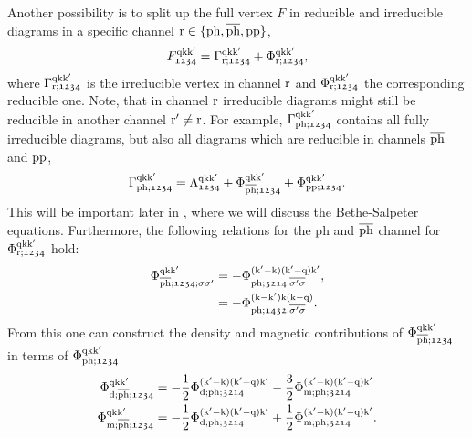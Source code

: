 \documentclass[../../main.tex]{subfiles}
\begin{document}
Another possibility is to split up the full vertex $F$ in reducible and irreducible diagrams in a specific channel $\text{r}\in\{\text{ph},\overline{\text{ph}},\text{pp}\}$,
\begin{align}\label{eq:full_vertex_gamma_phi}
	F_{\mathfrak{1234}}^{\text{q}\text{k}\text{k}'}=\Gamma_{\text{r};\mathfrak{1234}}^{\text{q}\text{k}\text{k}'}+\Phi_{\text{r};\mathfrak{1234}}^{\text{q}\text{k}\text{k}'},
\end{align}
where $\Gamma_{\text{r};\mathfrak{1234}}^{\text{q}\text{k}\text{k}'}$ is the irreducible vertex in channel $\text{r}$ and $\Phi_{\text{r};\mathfrak{1234}}^{\text{q}\text{k}\text{k}'}$ the corresponding reducible one. Note, that in channel $\text{r}$ irreducible diagrams might still be reducible in another channel $\text{r}'\neq \text{r}$. For example, $\Gamma_{\text{ph};\mathfrak{1234}}^{\text{q}\text{k}\text{k}'}$ contains all fully irreducible diagrams, but also all diagrams which are reducible in channels $\overline{\text{ph}}$ and $\text{pp}$,
\begin{align}
	\Gamma_{\text{ph};\mathfrak{1234}}^{\text{q}\text{k}\text{k}'}=\Lambda_{\mathfrak{1234}}^{\text{q}\text{k}\text{k}'}+\Phi_{\overline{\text{ph}};\mathfrak{1234}}^{\text{q}\text{k}\text{k}'}+\Phi_{\text{pp};\mathfrak{1234}}^{\text{q}\text{k}\text{k}'}.
\end{align}
This will be important later in , where we will discuss the Bethe-Salpeter equations. Furthermore, the following relations for the ph and $\overline{\text{ph}}$ channel for $\Phi_{\text{r};\mathfrak{1234}}^{\text{q}\text{k}\text{k}'}$ hold:
\begin{subequations}\label{eq:phi_conversion_ph_bar_to_ph}
\begin{align}
	\Phi_{\overline{\text{ph}};\mathfrak{1234};\sigma\sigma'}^{\text{q}\text{k}\text{k}'}&=-\Phi_{\text{ph};\mathfrak{3214};\overline{\sigma'\sigma}}^{(\text{k}'-\text{k})(\text{k}'-\text{q})\text{k}'},\\
	&=-\Phi_{\text{ph};\mathfrak{1432};\overline{\sigma'\sigma}}^{(\text{k}-\text{k}')\text{k}(\text{k}-\text{q})}.
\end{align}
\end{subequations}
From this one can construct the density and magnetic contributions of $\Phi_{\overline{\text{ph}};\mathfrak{1234}}^{\text{q}\text{k}\text{k}'}$ in terms of $\Phi_{\text{ph};\mathfrak{1234}}^{\text{q}\text{k}\text{k}'}$
\begin{subequations}\label{eq:phi_ph_bar_dens_magn}
\begin{align}
	\Phi_{\text{d};\overline{\text{ph}};\mathfrak{1234}}^{\text{q}\text{k}\text{k}'}&=-\frac12\Phi_{\text{d};\text{ph};\mathfrak{3214}}^{(\text{k}'-\text{k})(\text{k}'-\text{q})\text{k}'}-\frac32\Phi_{\text{m};\text{ph};\mathfrak{3214}}^{(\text{k}'-\text{k})(\text{k}'-\text{q})\text{k}'}\\
	\Phi_{\text{m};\overline{\text{ph}};\mathfrak{1234}}^{\text{q}\text{k}\text{k}'}&=-\frac12\Phi_{\text{d};\text{ph};\mathfrak{3214}}^{(\text{k}'-\text{k})(\text{k}'-\text{q})\text{k}'}+\frac12\Phi_{\text{m};\text{ph};\mathfrak{3214}}^{(\text{k}'-\text{k})(\text{k}'-\text{q})\text{k}'}.
\end{align}
\end{subequations}
\end{document}
